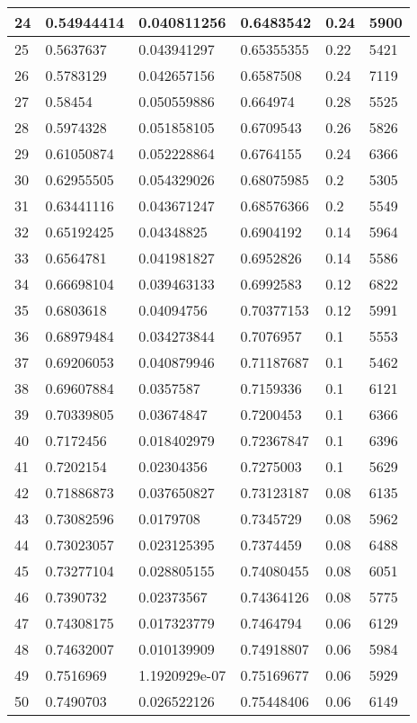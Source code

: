 \begin{longtable}{|l|l|l|l|l|l|}
24 & 0.54944414 & 0.040811256 & 0.6483542 & 0.24 & 5900 \\ \hline 
25 & 0.5637637 & 0.043941297 & 0.65355355 & 0.22 & 5421 \\ \hline 
26 & 0.5783129 & 0.042657156 & 0.6587508 & 0.24 & 7119 \\ \hline 
27 & 0.58454 & 0.050559886 & 0.664974 & 0.28 & 5525 \\ \hline 
28 & 0.5974328 & 0.051858105 & 0.6709543 & 0.26 & 5826 \\ \hline 
29 & 0.61050874 & 0.052228864 & 0.6764155 & 0.24 & 6366 \\ \hline 
30 & 0.62955505 & 0.054329026 & 0.68075985 & 0.2 & 5305 \\ \hline 
31 & 0.63441116 & 0.043671247 & 0.68576366 & 0.2 & 5549 \\ \hline 
32 & 0.65192425 & 0.04348825 & 0.6904192 & 0.14 & 5964 \\ \hline 
33 & 0.6564781 & 0.041981827 & 0.6952826 & 0.14 & 5586 \\ \hline 
34 & 0.66698104 & 0.039463133 & 0.6992583 & 0.12 & 6822 \\ \hline 
35 & 0.6803618 & 0.04094756 & 0.70377153 & 0.12 & 5991 \\ \hline 
36 & 0.68979484 & 0.034273844 & 0.7076957 & 0.1 & 5553 \\ \hline 
37 & 0.69206053 & 0.040879946 & 0.71187687 & 0.1 & 5462 \\ \hline 
38 & 0.69607884 & 0.0357587 & 0.7159336 & 0.1 & 6121 \\ \hline 
39 & 0.70339805 & 0.03674847 & 0.7200453 & 0.1 & 6366 \\ \hline 
40 & 0.7172456 & 0.018402979 & 0.72367847 & 0.1 & 6396 \\ \hline 
41 & 0.7202154 & 0.02304356 & 0.7275003 & 0.1 & 5629 \\ \hline 
42 & 0.71886873 & 0.037650827 & 0.73123187 & 0.08 & 6135 \\ \hline 
43 & 0.73082596 & 0.0179708 & 0.7345729 & 0.08 & 5962 \\ \hline 
44 & 0.73023057 & 0.023125395 & 0.7374459 & 0.08 & 6488 \\ \hline 
45 & 0.73277104 & 0.028805155 & 0.74080455 & 0.08 & 6051 \\ \hline 
46 & 0.7390732 & 0.02373567 & 0.74364126 & 0.08 & 5775 \\ \hline 
47 & 0.74308175 & 0.017323779 & 0.7464794 & 0.06 & 6129 \\ \hline 
48 & 0.74632007 & 0.010139909 & 0.74918807 & 0.06 & 5984 \\ \hline 
49 & 0.7516969 & 1.1920929e-07 & 0.75169677 & 0.06 & 5929 \\ \hline 
50 & 0.7490703 & 0.026522126 & 0.75448406 & 0.06 & 6149 \\ \hline 
\end{longtable}